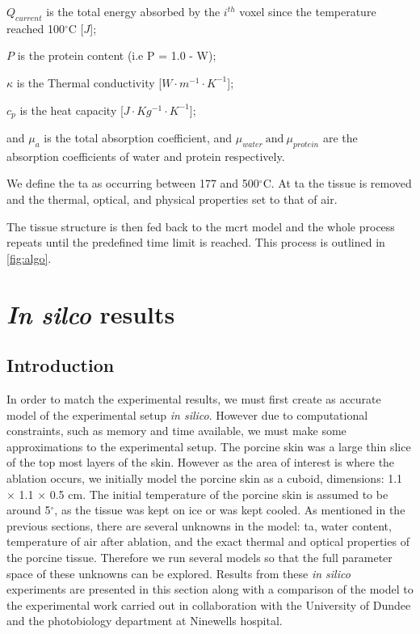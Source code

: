\indent $Q_{current}$ is the total energy absorbed by the $i^{th}$ voxel since the temperature reached 100$^{\circ}$C [$J$];

\indent $P$ is the protein content (i.e P = 1.0 - W);

\indent $\kappa$ is the Thermal conductivity [$W\cdot m^{-1}\cdot K^{-1}$];

\indent $c_p$ is the heat capacity [$J\cdot Kg^{-1}\cdot K^{-1}$];

\indent and $\mu_a$ is the total absorption coefficient, and $\mu_{water}\ \text{and}\ \mu_{protein}$ are the absorption coefficients of water and protein respectively.

\medskip

We define the \gls{ta} as occurring between 177 and 500$^{\circ}$C\cite{gerstmann1994char,mckenzie1986three}. At \gls{ta} the tissue is removed and the thermal, optical, and physical properties set to that of air.

The tissue structure is then fed back to the \gls{mcrt} model and the whole process repeats until the predefined time limit is reached. This process is outlined in \cref{fig:algo}.

\section{\textit{In silco} results} 

\subsection{Introduction}%

In order to match the experimental results, we must first create as accurate model of the experimental setup \textit{in silico}. However due to computational constraints, such as memory and time available, we must make some approximations to the experimental setup. The porcine skin was a large thin slice of the top most layers of the skin. However as the area of interest is where the ablation occurs, we initially  model the porcine skin as a cuboid, dimensions:  1.1 $\times$ 1.1 $\times$ 0.5 cm. The initial temperature of the porcine skin is assumed to be around 5$^{\circ}$, as the tissue was kept on ice or was kept cooled. 
As mentioned in the previous sections, there are several unknowns in the model: \gls{ta}, water content, temperature of air after ablation, and the exact thermal and optical properties of the porcine tissue. Therefore we run several models so that the full parameter space of these unknowns can be explored.
Results from these \textit{in silico} experiments are presented in this section along with a comparison of the model to the experimental work carried out in collaboration with the University of Dundee and the photobiology department at Ninewells hospital.


